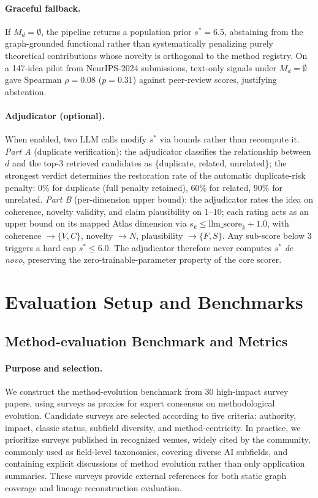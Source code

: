 \documentclass{llmxive}
\begin{document}
\paragraph{Graceful fallback.}
If $M_d=\emptyset$, the pipeline returns a population prior $s^\ast=6.5$, abstaining from the graph-grounded
functional rather than systematically penalizing purely theoretical contributions whose novelty is orthogonal to
the method registry. On a 147-idea pilot from NeurIPS-2024 submissions, text-only signals under $M_d=\emptyset$
gave Spearman $\rho=0.08$ ($p=0.31$) against peer-review scores, justifying abstention.

\paragraph{Adjudicator (optional).}
When enabled, two LLM calls modify $s^\ast$ via bounds rather than recompute it. \emph{Part A} (duplicate
verification): the adjudicator classifies the relationship between $d$ and the top-3 retrieved candidates as
\{duplicate, related, unrelated\}; the strongest verdict determines the restoration rate of the automatic
duplicate-risk penalty: $0\%$ for duplicate (full penalty retained), $60\%$ for related, $90\%$ for unrelated.
\emph{Part B} (per-dimension upper bound): the adjudicator rates the idea on coherence, novelty validity, and
claim plausibility on $1$--$10$; each rating acts as an upper bound on its mapped Atlas dimension via
$s_k\le\mathrm{llm\_score}_k+1.0$, with coherence $\to\{V,C\}$, novelty $\to N$, plausibility $\to\{F,S\}$. Any
sub-score below $3$ triggers a hard cap $s^\ast\le 6.0$. The adjudicator therefore never computes $s^\ast$
\emph{de novo}, preserving the zero-trainable-parameter property of the core scorer.




\section{Evaluation Setup and Benchmarks}
\label{app:setup}

\subsection{Method-evaluation Benchmark and Metrics}
\label{app:survey-benchmark}

\paragraph{Purpose and selection.}
We construct the method-evolution benchmark from 30 high-impact survey papers, using surveys as proxies for expert consensus on methodological evolution.
Candidate surveys are selected according to five criteria: authority, impact, classic status, subfield diversity, and method-centricity. In practice, we
prioritize surveys published in recognized venues, widely cited by the community, commonly used as field-level taxonomies, covering diverse AI subfields,
and containing explicit discussions of method evolution rather than only application summaries. These surveys provide external references for both static
graph coverage and lineage reconstruction evaluation.
\end{document}
